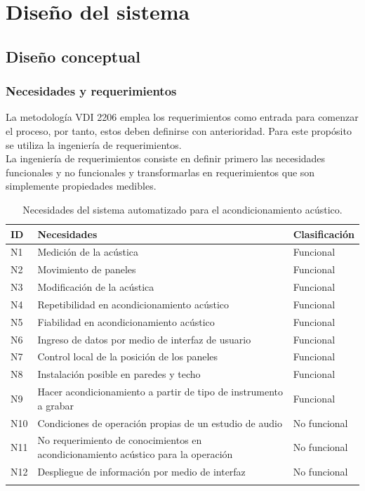 \section{Diseño del sistema}
\subsection{Diseño conceptual}
\subsubsection{Necesidades y requerimientos}
La metodología VDI 2206 emplea los requerimientos como entrada para comenzar el proceso, por tanto, estos deben definirse con anterioridad. Para este propósito se utiliza la ingeniería de requerimientos.
\\
La ingeniería de requerimientos consiste en definir primero las necesidades funcionales y no funcionales y transformarlas en requerimientos que son simplemente propiedades medibles.

\begin{center}
\footnotesize
    \begin{longtable}[!htb]{| m{3em} | m{30em} | m{6em}|}
    \hline
    \textbf{ID}& \textbf{Necesidades} & \textbf{Clasificación}\\
    \hline \hline
    N1 & Medición de la acústica & Funcional\\
    \hline
    N2 & Movimiento de paneles & Funcional\\
    \hline
    N3 & Modificación de la acústica & Funcional\\
    \hline
    N4 & Repetibilidad en acondicionamiento acústico & Funcional\\
    \hline
    N5 & Fiabilidad en acondicionamiento acústico & Funcional\\
    \hline
    N6 & Ingreso de datos por medio de interfaz de usuario & Funcional\\
    \hline
    N7 & Control local de la posición de los paneles & Funcional\\
    \hline
    N8 & Instalación posible en paredes y techo & Funcional\\
    \hline
    N9 & Hacer acondicionamiento a partir de tipo de instrumento a grabar & Funcional\\
    \hline
    N10 & Condiciones de operación propias de un estudio de audio & No funcional\\
    \hline
    N11 & No requerimiento de conocimientos en acondicionamiento acústico para la operación & No funcional \\
    \hline
    N12 & Despliegue de información por medio de interfaz & No funcional\\
    \hline

    \caption{Necesidades del sistema automatizado para el acondicionamiento acústico.}
    \label{tab:Necesidades}
    \end{longtable}
\end{center}

